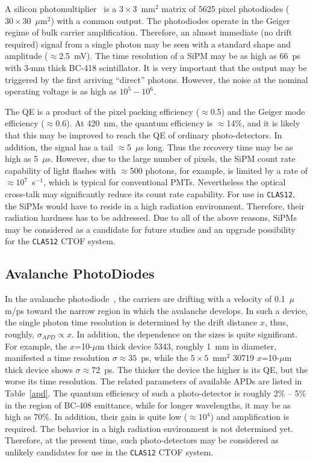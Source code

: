 A silicon photomultiplier~\cite{dolgo} is a $3 \times 3$~mm$^2$ matrix of 
5625 pixel photodiodes ($30 \times 30$~$\mu$m$^2$) with a common output. 
The photodiodes operate in the Geiger regime of bulk carrier amplification.  
Therefore, an almost immediate (no drift required) signal from a single 
photon may be seen with a standard shape and amplitude ($\approx$2.5~mV).  
The time resolution of a SiPM may be as high as 66~ps~\cite{dolgo} with 
3-mm thick BC-418 scintillator.  It is very important that the output may 
be triggered by the first arriving ``direct'' photons.  However, the noise 
at the nominal operating voltage is as high as $10^5-10^6$. 

The QE is a product of the pixel packing efficiency ($\approx$0.5) and the
Geiger mode efficiency ($\approx$0.6).  At 420~nm, the quantum efficiency
is $\approx$14\%, and it is likely that this may be improved to reach the 
QE of ordinary photo-detectors.  In addition, the signal has a tail 
$\approx$5~$\mu$s long.  Thus the recovery time may be as high as 5~$\mu$s.  
However, due to the large number of pixels, the SiPM count rate capability 
of light flashes with $\approx$500 photons, for example, is limited by a
rate of $\approx 10^7$~s$^{-1}$, which is typical for conventional PMTs.  
Nevertheless the optical cross-talk may significantly reduce its count rate 
capability.  For use in {\tt CLAS12}, the SiPMs would have to reside in a  
high radiation environment.  Therefore, their radiation hardness has to be 
addressed.  Due to all of the above reasons, SiPMs may be considered as a
candidate for future studies and an upgrade possibility for the {\tt CLAS12} 
CTOF system.
 
\subsection{Avalanche PhotoDiodes}

In the avalanche photodiode~\cite{apd}, the carriers are drifting with a 
velocity of 0.1~$\mu$m/ps toward the narrow region in which the avalanche 
develops. In such a device, the single photon time resolution is determined 
by the drift distance $x$, thus, roughly, $\sigma_{APD}\propto x$.  In 
addition, the dependence on the sizes is quite significant.  For example, 
the $x$=10-$\mu$m thick device 5343, roughly 1~mm in diameter, manifested a 
time resolution $\sigma \approx 35$~ps, while the $5\times5$~mm$^2$ 30719 
$x$=10-$\mu$m thick device shows $\sigma\approx$72~ps.  The thicker the 
device the higher is its QE, but the worse its time resolution.  The related 
parameters of available APDs are listed in Table~\ref{apd}.  The quantum 
efficiency of such a photo-detector is roughly 2\% -- 5\% in the region of 
BC-408 emittance, while for longer wavelengths, it may be as high as 70\%. 
In addition, their gain is quite low ($\approx10^4$) and amplification is 
required.  The behavior in a high radiation environment is not determined yet.
Therefore, at the present time, such photo-detectors may be considered as 
unlikely candidates for use in the {\tt CLAS12} CTOF system.

